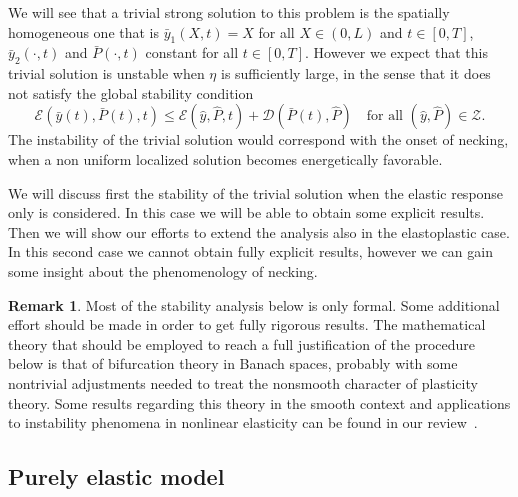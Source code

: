 \documentclass[a4paper,10pt,oneside]{amsbook}
\numberwithin{section}{chapter}
\numberwithin{equation}{chapter}
\theoremstyle{definition}
\newtheorem{rmk}[prop]{Remark}
\begin{document}
We will see that a trivial strong solution to this problem is the spatially homogeneous one that is $\bar{y}_1(X,t)=X$ for all $X\in(0,L)$ and $t\in[0,T]$, $\bar{y}_2(\cdot,t)$ and $\bar{P}(\cdot,t)$ constant for all $t\in[0,T]$. However we expect that this trivial solution is unstable when $\eta$ is sufficiently large, in the sense that it does not satisfy the global stability condition
\[
\mathcal{E}(\bar{y}(t),\bar{P}(t),t)\le\mathcal{E}(\hat y,\hat P,t)+\mathcal{D}(\bar P(t),\hat P)\quad\text{for all $(\hat y,\hat P)\in\mathscr{Z}$}.
\]
The instability of the trivial solution would correspond with the onset of necking, when a non uniform localized solution becomes energetically favorable.

We will discuss first the stability of the trivial solution when the elastic response only is considered. In this case we will be able to obtain some explicit results. Then we will show our efforts to extend the analysis also in the elastoplastic case. In this second case we cannot obtain fully explicit results, however we can gain some insight about the phenomenology of necking.
\begin{rmk}
Most of the stability analysis below is only formal. Some additional effort should be made in order to get fully rigorous results. The mathematical theory that should be employed to reach a full justification of the procedure below is that of bifurcation theory in Banach spaces, probably with some nontrivial adjustments needed to treat the nonsmooth character of plasticity theory. Some results regarding this theory in the smooth context and applications to instability phenomena in nonlinear elasticity can be found in our review~\cite{progetto-ponno}.
\end{rmk}

\subsection{Purely elastic model}
\end{document}
